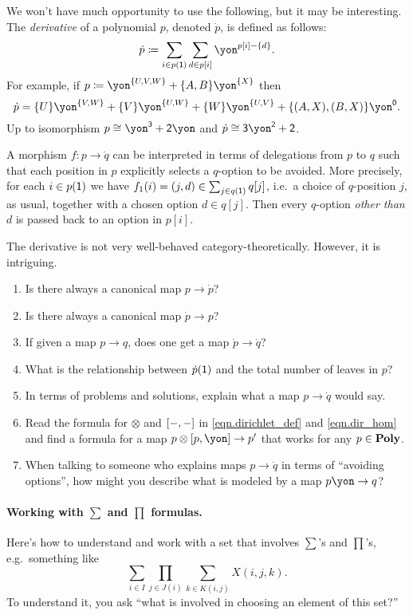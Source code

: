 \documentclass[DynamicalBook]{subfiles}
\begin{document}
\begin{example}[Derivatives]
We won't have much opportunity to use the following, but it may be interesting. The \emph{derivative} of a polynomial $p$, denoted $\dot{p}$, is defined as follows:
\[
\dot{p}\coloneqq\sum_{i\in p(\1)}\sum_{d\in p[i]}\yon^{p[i]-\{d\}}.
\]
For example, if $p\coloneq\yon^{\{U,V,W\}}+\{A,B\}\yon^{\{X\}}$ then 
\[\dot{p}=\{U\}\yon^{\{V,W\}}+\{V\}\yon^{\{U,W\}}+\{W\}\yon^{\{U,V\}}+\{(A,X),(B,X)\}\yon^\0.\]
Up to isomorphism $p\cong\yon^\3+\2\yon$ and $\dot{p}\cong\3\yon^\2+\2$.

A morphism $f\colon p\to \dot{q}$ can be interpreted in terms of delegations from $p$ to $q$ such that each position in $p$ explicitly selects a $q$-option to be avoided. More precisely, for each $i\in p(\textsf{1})$ we have $f_1(i)=(j,d)\in \sum_{j\in q(\textsf{1})}q[j]$, i.e.\ a choice of $q$-position $j$, as usual, together with a chosen option $d\in q[j]$. Then every $q$-option \emph{other than $d$} is passed back to an option in $p[i]$.
\end{example}

\begin{exercise}
The derivative is not very well-behaved category-theoretically. However, it is intriguing.
\begin{enumerate}
	\item Is there always a canonical map $p\to \dot{p}$?
	\item Is there always a canonical map $\dot{p}\to p$?
	\item If given a map $p\to q$, does one get a map $\dot{p}\to\dot{q}$?
	\item What is the relationship between $\dot{p}(\textsf{1})$ and the total number of leaves in $p$?
	\item In terms of problems and solutions, explain what a map $p\to \dot{q}$ would say.
	\item Read the formula for $\otimes$ and $[-,-]$ in \eqref{eqn.dirichlet_def} and \eqref{eqn.dir_hom} and find a formula for a map $p\otimes\ihom{p,\yon}\to p'$ that works for any $p\in\textbf{Poly}$.
	\item When talking to someone who explains maps $p\to\dot{q}$ in terms of ``avoiding options'', how might you describe what is modeled by a map $p\yon\to q$?
\end{enumerate}
\end{exercise}

\paragraph{Working with $\sum$ and $\prod$ formulas.}
Here's how to understand and work with a set that involves $\sum$'s and $\prod$'s, e.g.\ something like
\begin{equation}\label{eqn.misc98339}
\sum_{i\in I}\prod_{j\in J(i)}\sum_{k\in K(i,j)}X(i,j,k).
\end{equation}
To understand it, you ask ``what is involved in choosing an element of this set?'' 
\end{document}
